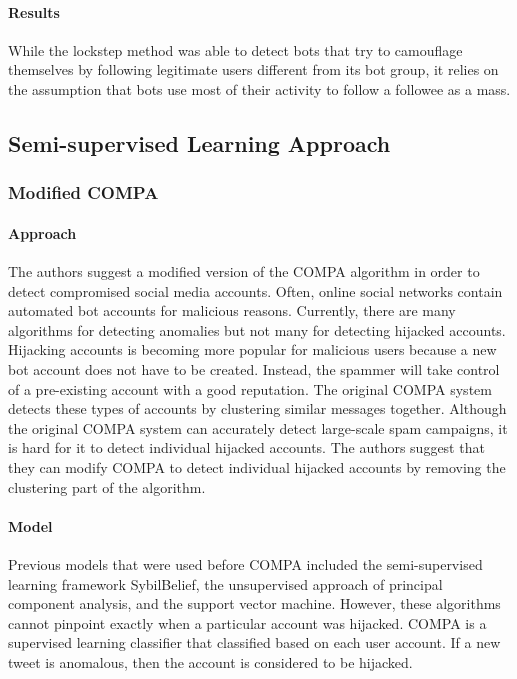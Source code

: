\documentclass[11pt, oneside]{article}   	%
\begin{document}
\paragraph{Results}
\quad

\quad While the lockstep method was able to detect bots that try to camouflage themselves by following legitimate users different from its bot group, it relies on the assumption that bots use most of their activity to follow a followee as a mass.

\subsection{Semi-supervised Learning Approach}
\subsubsection{Modified COMPA }

\paragraph*{Approach}
\quad

\quad The authors \cite{compa} suggest a modified version of the COMPA algorithm in order to detect compromised social media accounts.
Often, online social networks contain automated bot accounts for malicious reasons.
Currently, there are many algorithms for detecting anomalies but not many for detecting hijacked accounts.
Hijacking accounts is becoming more popular for malicious users because a new bot account does not have to be created.
Instead, the spammer will take control of a pre-existing account with a good reputation.
The original COMPA system detects these types of accounts by clustering similar messages together.
Although the original COMPA system can accurately detect large-scale spam campaigns, it is hard for it to detect individual hijacked accounts.
The authors suggest that they can modify COMPA to detect individual hijacked accounts by removing the clustering part of the algorithm.

\paragraph{Model}
\quad

\quad Previous models that were used before COMPA included the semi-supervised learning framework SybilBelief, the unsupervised approach of principal component analysis, and the support vector machine.
However, these algorithms cannot pinpoint exactly when a particular account was hijacked.
COMPA is a supervised learning classifier that classified based on each user account.
If a new tweet is anomalous, then the account is considered to be hijacked.
\end{document}
